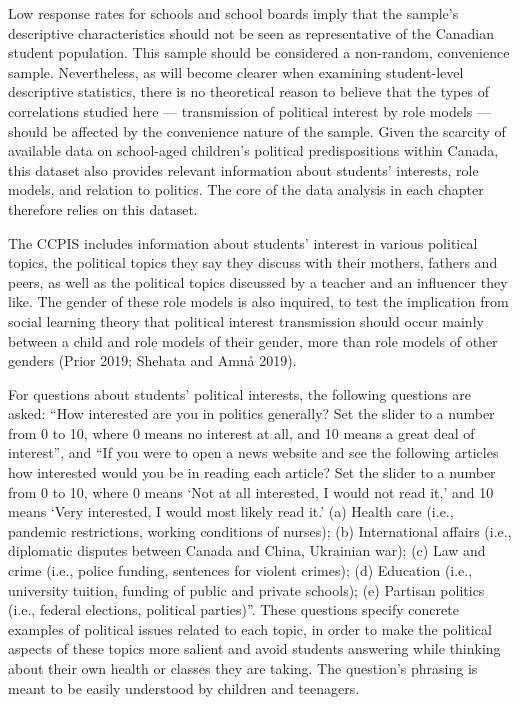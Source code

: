 \documentclass[
  letterpaper,
  DIV=11,
  numbers=noendperiod]{scrreprt}
\begin{document}
Low response rates for schools and school boards imply that the sample's
descriptive characteristics should not be seen as representative of the
Canadian student population. This sample should be considered a
non-random, convenience sample. Nevertheless, as will become clearer
when examining student-level descriptive statistics, there is no
theoretical reason to believe that the types of correlations studied
here --- transmission of political interest by role models --- should be
affected by the convenience nature of the sample. Given the scarcity of
available data on school-aged children's political predispositions
within Canada, this dataset also provides relevant information about
students' interests, role models, and relation to politics. The core of
the data analysis in each chapter therefore relies on this dataset.

The CCPIS includes information about students' interest in various
political topics, the political topics they say they discuss with their
mothers, fathers and peers, as well as the political topics discussed by
a teacher and an influencer they like. The gender of these role models
is also inquired, to test the implication from social learning theory
that political interest transmission should occur mainly between a child
and role models of their gender, more than role models of other genders
(Prior 2019; Shehata and Amnå 2019).

For questions about students' political interests, the following
questions are asked: ``How interested are you in politics generally? Set
the slider to a number from 0 to 10, where 0 means no interest at all,
and 10 means a great deal of interest'', and ``If you were to open a
news website and see the following articles how interested would you be
in reading each article? Set the slider to a number from 0 to 10, where
0 means `Not at all interested, I would not read it,' and 10 means `Very
interested, I would most likely read it.' (a) Health care (i.e.,
pandemic restrictions, working conditions of nurses); (b) International
affairs (i.e., diplomatic disputes between Canada and China, Ukrainian
war); (c) Law and crime (i.e., police funding, sentences for violent
crimes); (d) Education (i.e., university tuition, funding of public and
private schools); (e) Partisan politics (i.e., federal elections,
political parties)''. These questions specify concrete examples of
political issues related to each topic, in order to make the political
aspects of these topics more salient and avoid students answering while
thinking about their own health or classes they are taking. The
question's phrasing is meant to be easily understood by children and
teenagers.
\end{document}
